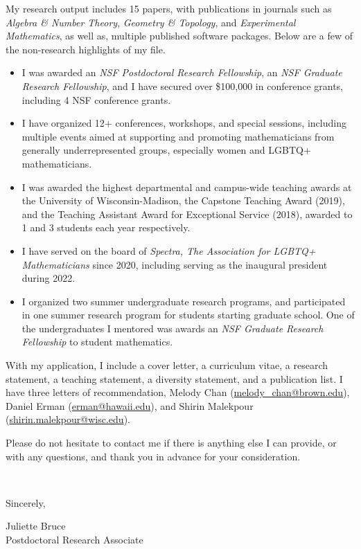 \documentclass[11pt]{article}
\begin{document}
My research output includes 15 papers, with publications in journals such as \textit{Algebra \& Number Theory}, \textit{Geometry \& Topology}, and \textit{Experimental Mathematics}, as well as, multiple published software packages. Below are a few of the non-research highlights of my file.
\begin{itemize}[leftmargin=*]
\item I was awarded an \textit{NSF Postdoctoral Research Fellowship}, an \textit{NSF Graduate Research Fellowship}, and I have secured over \$100,000 in conference grants, including 4 NSF conference grants. 
\item I have organized 12+ conferences, workshops, and special sessions, including multiple events aimed at supporting and promoting mathematicians from generally underrepresented groups, especially women and LGBTQ+ mathematicians. 
\item I was awarded the highest departmental and campus-wide teaching awards at the University of Wisconsin-Madison, the Capstone Teaching Award (2019), and the Teaching Assistant Award for Exceptional Service (2018), awarded to 1 and 3 students each year respectively. 
\item I have served on the board of \textit{Spectra, The Association for LGBTQ+ Mathematicians} since 2020, including serving as the inaugural president during 2022. 
\item I organized two summer undergraduate research programs, and participated in one summer research program for students starting graduate school. One of the undergraduates I mentored was awards an \textit{NSF Graduate Research Fellowship} to student mathematics.  
\end{itemize}

With my application, I include a cover letter, a curriculum vitae, a research statement, a teaching statement, a diversity statement, and a publication list. I have three letters of recommendation, Melody Chan (\href{mailto:melody\_chan@brown.edu}{melody\_chan@brown.edu}), Daniel Erman (\href{mailto:erman@hawaii.edu}{erman@hawaii.edu}), and Shirin Malekpour (\href{mailto:shirin.malekpour@wisc.edu}{shirin.malekpour@wisc.edu}).  

Please do not hesitate to contact me if there is anything else I can provide, or with any questions, and thank you in advance for your consideration. 

\vspace{24pt}
\noindent
\begin{minipage}{0.99\textwidth}
\begin{minipage}{0.69\textwidth}
\textcolor{white}{.}
\end{minipage}
\begin{minipage}{0.29\textwidth}
Sincerely, 

\vspace{36pt}
Juliette Bruce\\
Postdoctoral Research Associate\end{minipage}
\end{minipage}
\end{document}
